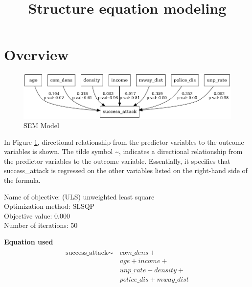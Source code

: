 \documentclass[10pt, conference, compsocconf]{IEEEtran}
\title{Structure equation modeling}
\begin{document}
	
	
	\maketitle
	
\section{Overview}	
	\begin{figure}[h!]
		\centering
		\includegraphics[width=\linewidth]{success.png}
		\caption{SEM Model}
		\label{fig:Model}
	\end{figure}
	
	In Figure \ref{fig:Model}, directional relationship from the predictor variables to the outcome variables is shown. 
	The tilde symbol \textasciitilde,  indicates a directional relationship from the predictor variables to the outcome variable. Essentially, it specifies that success\_attack is regressed on the other variables listed on the right-hand side of the formula.
	
	Name of objective: (ULS) unweighted least square \\
	Optimization method: SLSQP\\
	Objective value: 0.000\\
	Number of iterations: 50
	
\textbf{Equation used}
\begin{subequations}
	\begin{align}
		\begin{split}
			\text{success\_attack} \sim &\, com\_dens + \\
			&\, age + income + \\
			&\, unp\_rate + density + \\
			&\, police\_dis + mway\_dist
		\end{split}
	\end{align}
\end{subequations}
\end{document}
